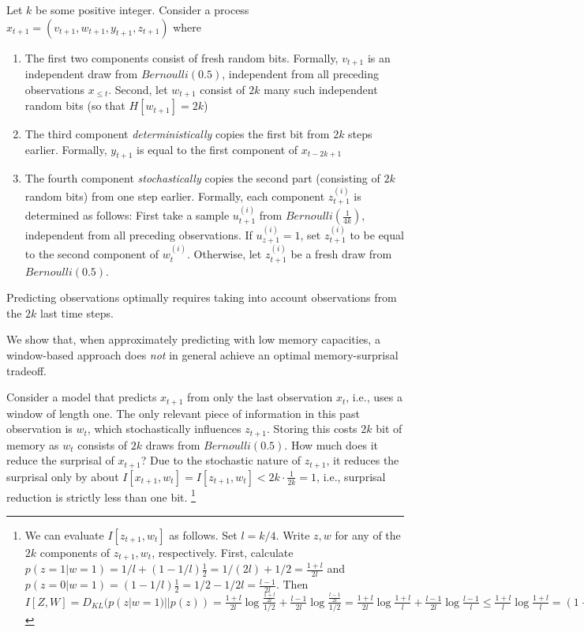 \documentclass[11pt,letterpaper]{article}
\begin{document}
Let $k$ be some positive integer.
Consider a process
$x_{t+1} = (v_{t+1}, w_{t+1}, y_{t+1}, z_{t+1})$
where
\begin{enumerate}
	\item The first two components consist of fresh random bits. Formally, $v_{t+1}$ is an independent draw from $Bernoulli(0.5)$, independent from all preceding observations $x_{\leq t}$.
		Second, let $w_{t+1}$ consist of $2k$ many such independent random bits (so that $H[w_{t+1}] = 2k$)
	\item The third component \emph{deterministically} copies the first bit from $2k$ steps earlier. Formally, $y_{t+1}$ is equal to the first component of $x_{t-2k+1}$
	\item The fourth component \emph{stochastically} copies the second part (consisting of $2k$ random bits) from one step earlier. Formally, each component $z_{t+1}^{(i)}$ is determined as follows: First take a sample $u_{t+1}^{(i)}$ from $Bernoulli(\frac{1}{4k})$, independent from all preceding observations.
		If $u_{z+1}^{(i)}=1$, set $z_{t+1}^{(i)}$ to be equal to the second component of $w_{t}^{(i)}$.
		Otherwise, let $z_{t+1}^{(i)}$ be a fresh draw from $Bernoulli(0.5)$.
\end{enumerate}

Predicting observations optimally requires taking into account observations from the $2k$ last time steps.

We show that, when approximately predicting with low memory capacities, a window-based approach does \emph{not} in general achieve an optimal memory-surprisal tradeoff.

Consider a model that predicts $x_{t+1}$ from only the last observation $x_t$, i.e., uses a window of length one.
The only relevant piece of information in this past observation is $w_t$, which stochastically influences $z_{t+1}$.
Storing this costs $2k$ bit of memory as $w_t$ consists of $2k$ draws from $Bernoulli(0.5)$.
How much does it reduce the surprisal of $x_{t+1}$?
Due to the stochastic nature of $z_{t+1}$, it reduces the surprisal only by about $I[x_{t+1}, w_t] = I[z_{t+1}, w_t] < 2k \cdot \frac{1}{2k} = 1$, i.e., surprisal reduction is strictly less than one bit.
\footnote{We can evaluate $I[z_{t+1}, w_t]$ as follows. Set $l = k/4$. Write $z, w$ for any of the $2k$ components of $z_{t+1}, w_t$, respectively. First, calculate $p(z = 1|w=1) = 1/l + (1-1/l) \frac{1}{2} = 1/(2l) + 1/2 = \frac{1+l}{2l}$ and $p(z = 0|w=1) = (1-1/l) \frac{1}{2} = 1/2 - 1/2l = \frac{l-1}{2l}$.
Then $I[Z, W] = D_{KL}(p(z|w=1)||p(z)) = \frac{1+l}{2l} \log \frac{\frac{1+l}{2l}}{1/2} + \frac{l-1}{2l} \log \frac{\frac{l-1}{2l}}{1/2}  = \frac{1+l}{2l} \log \frac{1+l}{l} + \frac{l-1}{2l} \log \frac{l-1}{l}  \leq \frac{1+l}{l} \log \frac{1+l}{l} =  (1+1/l) \log (1+1/l)  \leq  (1+1/l) (1/l) = 1/l + 1/l^2 < 2/l = \frac{1}{2k}.$
}
\end{document}
